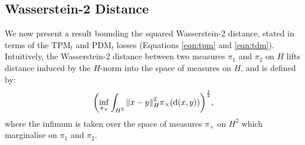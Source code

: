 
\subsection{Wasserstein-2 Distance}
We now present a result bounding the squared Wasserstein-2 distance, stated in terms of the \(\mathrm{TPM}_{t}\) and \(\mathrm{PDM}_{t}\) losses (Equations \ref{eqn:tpm} and \ref{eqn:tdm}). Intuitively, the Wasserstein-2 distance between two measures \(\pi_{1}\) and \(\pi_{2}\) on \(H\) lifts distance induced by the \(H\)-norm into the space of measures on \(H\), and is defined by:
\[
  \qty(\inf_{\pi_{\times}} \int_{H^{2}} \norm{x - y}^{2}_{H} \pi_{\times}(\dd{(x, y)}))^{\frac{1}{2}},
\]
where the infimum is taken over the space of measures \(\pi_{\times}\) on \(H^{2}\) which marginalise on \(\pi_{1}\) and \(\pi_{2}\).

